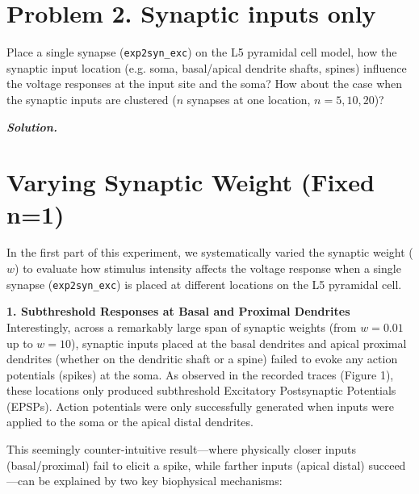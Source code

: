 \documentclass{article}
\newenvironment{solution}{%
    \par\noindent\begin{solutionbox}\textbf{\textit{Solution.}}\par\medskip\itshape
}{%
    \end{solutionbox}
}
\begin{document}
\clearpage

\section*{\textbf{Problem 2.} Synaptic inputs only}

Place a single synapse (\texttt{exp2syn\_exc}) on the L5 pyramidal cell model, how the synaptic input location (e.g. soma, basal/apical dendrite shafts, spines) influence the voltage responses at the input site and the soma? How about the case when the synaptic inputs are clustered ($n$ synapses at one location, $n=5,10,20$)?

\begin{solution}
    \section*{Varying Synaptic Weight  (Fixed n=1)}
In the first part of this experiment, we systematically varied the synaptic weight ($w$) to evaluate how stimulus intensity affects the voltage response when a single synapse (\texttt{exp2syn\_exc}) is placed at different locations on the L5 pyramidal cell.

\textbf{1. Subthreshold Responses at Basal and Proximal Dendrites} \\
Interestingly, across a remarkably large span of synaptic weights (from $w=0.01$ up to $w=10$), synaptic inputs placed at the basal dendrites and apical proximal dendrites (whether on the dendritic shaft or a spine) failed to evoke any action potentials (spikes) at the soma. As observed in the recorded traces (Figure 1), these locations only produced subthreshold Excitatory Postsynaptic Potentials (EPSPs). Action potentials were only successfully generated when inputs were applied to the soma or the apical distal dendrites.

This seemingly counter-intuitive result—where physically closer inputs (basal/proximal) fail to elicit a spike, while farther inputs (apical distal) succeed—can be explained by two key biophysical mechanisms:


\end{solution}
\end{document}
